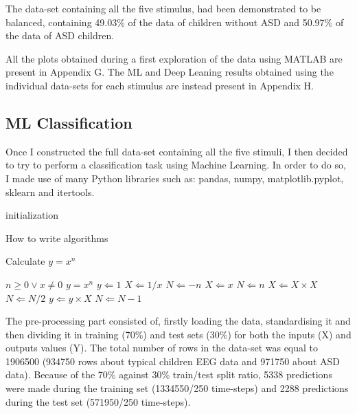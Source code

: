 The data-set containing all the five stimulus, had been demonstrated to be balanced, containing 49.03\% of the data of children without ASD and 50.97\% of the data of ASD children. 

All the plots obtained during a first exploration of the data using MATLAB are present in Appendix G. The ML and Deep Leaning results obtained using the individual data-sets for each stimulus are instead present in Appendix H.  

\subsection{ML Classification}
Once I constructed the full data-set containing all the five stimuli, I then decided to try to perform a classification task using Machine Learning. In order to do so, I made use of many Python libraries such as: pandas, numpy, matplotlib.pyplot, sklearn and itertools.

\begin{algorithm}[H]
\SetAlgoLined
{}
 initialization\;
 \caption{How to write algorithms}
\end{algorithm}

\begin{algorithm}
\caption{Calculate $y = x^n$}
\label{alg1}
\vspace*{-.4cm}
\begin{multicols}{2}
\begin{algorithmic}[1]
  \REQUIRE $n \geq 0 \vee x \neq 0$
  \ENSURE $y = x^n$
  \STATE $y \Leftarrow 1$
  \STATE $X \Leftarrow 1 / x$
  \STATE $N \Leftarrow -n$
  \ELSE
  \STATE $X \Leftarrow x$
  \STATE $N \Leftarrow n$
  \ENDIF
  \STATE $X \Leftarrow X \times X$
  \STATE $N \Leftarrow N / 2$
  \ELSE[$N$ is odd]
  \STATE $y \Leftarrow y \times X$
  \STATE $N \Leftarrow N - 1$
  \ENDIF
  \ENDWHILE
\end{algorithmic}
\end{multicols}
\vspace*{-.3cm}
\end{algorithm}

The pre-processing part consisted of, firstly loading the data, standardising it and then dividing it in training (70\%) and test sets (30\%) for both the inputs (X) and outputs values (Y). The total number of rows in the data-set was equal to 1906500 (934750 rows about typical children EEG data and 971750 about ASD data). Because of the 70\% against 30\% train/test split ratio, 5338 predictions were made during the training set (1334550/250 time-steps) and 2288 predictions during the test set (571950/250 time-steps).


